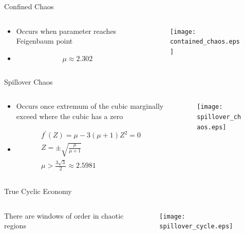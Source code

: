 \documentclass{beamer}
\begin{document}
\begin{frame}{Confined Chaos}
	\begin{columns}
		\begin{column}{0.5\textwidth}
			\begin{itemize}
				\item
					\centering
					Occurs when parameter reaches Feigenbaum point
				\pause
				\item
					\begin{equation*}
						\mu\approx2.302
					\end{equation*}
			\end{itemize}
		\end{column}
		\begin{column}{0.5\textwidth}
			\begin{figure}
				\centering
				\texttt{[image: contained\_chaos.eps]}
			\end{figure}
		\end{column}
	\end{columns}
\end{frame}

\begin{frame}{Spillover Chaos}
	\begin{columns}
		\begin{column}{0.5\textwidth}
			\begin{itemize}
				\item
					\centering
					Occurs once extremum of the cubic marginally exceed where the cubic has a zero
				\pause
				\item
					\begin{gather*}
						f^\prime(Z)=\mu-3(\mu+1)Z^2=0\\
						Z=\pm\sqrt{\frac{\mu}{\mu+1}}\\
						\mu>\frac{3\sqrt{3}}{2}\approx2.5981
					\end{gather*}
			\end{itemize}
		\end{column}
		\pause
		\begin{column}{0.5\textwidth}
			\begin{figure}
				\centering
				\texttt{[image: spillover\_chaos.eps]}
			\end{figure}
		\end{column}
	\end{columns}
\end{frame}

\begin{frame}{True Cyclic Economy}
	\begin{columns}
		\begin{column}{0.5\textwidth}
				There are windows of order in chaotic regions
		\end{column}
		\begin{column}{0.5\textwidth}
			\begin{figure}
				\centering
				\texttt{[image: spillover\_cycle.eps]}
			\end{figure}
		\end{column}
	\end{columns}
\end{frame}
\end{document}
